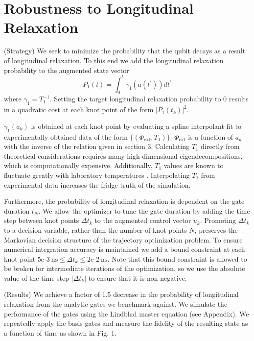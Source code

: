 \documentclass[
  amsfonts,
  amsmath,
  tbtags,
  amssymb,
  aps,
  nobibnotes,
  twocolumn,
]{revtex4-2}
\begin{document}
\section{Robustness to Longitudinal Relaxation}
(Strategy) We seek to minimize the probability
that the qubit decays as a result of longitudinal
relaxation. To this end we add the
longitudinal relaxation probability
to the augmented state vector
\begin{equation}
  P_{1}(t) = \int_{0}^{t} \gamma_{1}(a(t^{\prime})) dt^{\prime}
\end{equation}
where $\gamma_{1} = T_{1}^{-1}$. Setting the target
longitudinal relaxation probability to 0 results in
a quadratic cost at each knot point
of the form ${\lvert P_{1}(t_{k}) \rvert}^{2}$.

$\gamma_{1}(a_{k})$
is obtained at each knot point by evaluating
a spline interpolant fit to
experimentally obtained data of the form
$\{(\Phi_{\textrm{ext}}, T_{1})\}$.
$\Phi_{\textrm{ext}}$ is a function of $a_{k}$
with the inverse of the relation given in section 3.
Calculating $T_{1}$ directly from theoretical
considerations requires many high-dimensional
eigendecompositions, which
is computationally expensive. Additionally,
$T_{1}$ values are known to fluctuate greatly
with laboratory temperatures \cite{klimov2018fluctuations}.
Interpolating $T_{1}$ from experimental data increases
the fridge truth of the simulation.

Furthermore, the probability of longitudinal 
relaxation is dependent on the gate duration $t_{N}$.
We allow the optimizer to tune the gate duration by
adding the time step between knot points $\Delta t_{k}$
to the augmented control vector $u_{k}$.
Promoting $\Delta t_{k}$ to a decision variable, rather
than the number of knot points $N$, preserves the
Markovian decision structure of the trajectory
optimization problem. To ensure numerical
integration accuracy is maintained we add a bound
constraint at each knot point
$5\textrm{e-}3 \ \textrm{ns} \le
\Delta t_{k} \le 2\textrm{e-}2 \ \textrm{ns}$.
Note that this bound constraint is allowed to be
broken for intermediate iterations of the optimization,
so we use the absolute value of the time step
$\lvert \Delta t_{k} \rvert$ to ensure that it is non-negative.

(Results) We achieve a factor of 1.5 decrease in the probability
of longitudinal relaxation from the analytic gates we benchmark
against. We simulate the performance of the gates using the
Lindblad master equation (see Appendix). We repeatedly apply the basis gates
and measure the fidelity of the resulting state as a function
of time as shown in Fig. 1.
\end{document}
